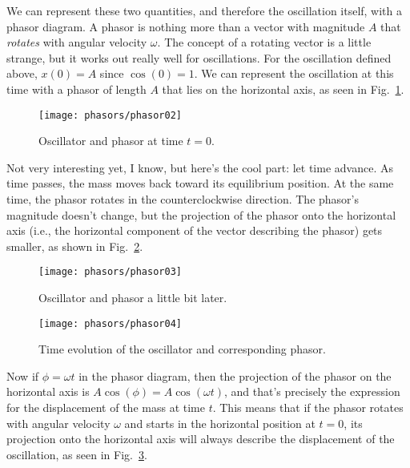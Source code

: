 We can represent these two quantities, and therefore the oscillation
itself, with a phasor diagram. A phasor is nothing more than a vector
with magnitude $A$ that {\em rotates} with angular velocity $\omega$. The
concept of a rotating vector is a little strange, but it works out really
well for oscillations.  For the oscillation defined above, $x(0) = A$
since $\cos{(0)} = 1$. We can represent the oscillation at this time
with a phasor of length $A$ that lies on the horizontal axis, as seen
in Fig.~\ref{fig:phasor02}.

\begin{figure}\begin{center}
 \texttt{[image: phasors/phasor02]} 
\caption{\label{fig:phasor02}Oscillator and phasor at time $t=0$.}
\end{center}
\end{figure}

Not very interesting yet, I know, but here's the cool part: let time
advance.  As time passes, the mass moves back toward its equilibrium
position. At the same time, the phasor rotates in the counterclockwise
direction. The phasor's magnitude doesn't change, but the projection
of the phasor onto the horizontal axis (i.e., the horizontal
component of the vector describing the phasor) gets smaller, as 
shown in Fig.~\ref{fig:phasor03}.

\begin{figure}\begin{center}
 \texttt{[image: phasors/phasor03]} 
\caption{\label{fig:phasor03}Oscillator and phasor a little bit later.}
\end{center}
\end{figure}

\begin{figure}\begin{center}
 \texttt{[image: phasors/phasor04]} 
\end{center}\caption{\label{fig:phasor04}Time evolution of the oscillator
and corresponding phasor.}
\end{figure}


Now if $\phi = \omega t$ in the phasor diagram, then the projection of
the phasor on the horizontal axis is $A\cos{(\phi)} = A\cos{(\omega
  t)}$, and that's precisely the expression for the displacement of
the mass at time $t$. This means that if the phasor rotates with
angular velocity $\omega$ and starts in the horizontal position at $t
= 0$, its projection onto the horizontal axis will always describe the
displacement of the oscillation, as seen in Fig.~\ref{fig:phasor04}.


